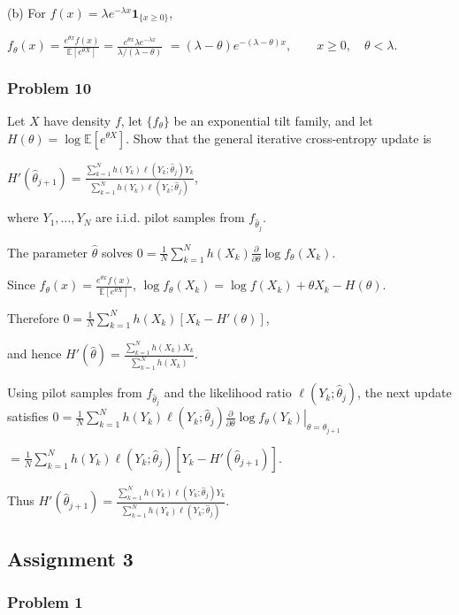 (b) For $f(x)=\lambda e^{-\lambda x}\mathbf1_{\{x\geq0\}}$,

$f_\theta(x)=\frac{e^{\theta x}f(x)}{\mathbb{E}[e^{\theta X}]}=\frac{e^{\theta x}\lambda e^{-\lambda x}}{\lambda/(\lambda-\theta)}$
$=(\lambda-\theta)e^{-(\lambda-\theta)x},\qquad x\geq0,\quad\theta<\lambda$.

\subsubsection*{Problem 10}

 Let $X$ have density $f$, let $\{f_\theta\}$ be an exponential tilt family, and let $H(\theta)=\log\mathbb{E}[e^{\theta X}]$. Show that the general iterative cross-entropy update is

$H'(\widehat\theta_{j+1})=\frac{\sum_{k=1}^Nh(Y_k)\ell(Y_k;\widehat\theta_j)Y_k}{\sum_{k=1}^Nh(Y_k)\ell(Y_k;\widehat\theta_j)}$,

where $Y_1,\ldots,Y_N$ are i.i.d. pilot samples from $f_{\widehat\theta_j}$.

 The parameter $\widehat\theta$ solves
$0=\frac1N\sum_{k=1}^Nh(X_k)\frac{\partial}{\partial\theta}\log f_\theta(X_k)$.

Since
$f_\theta(x)=\frac{e^{\theta x}f(x)}{\mathbb{E}[e^{\theta X}]}$,
$\log f_\theta(X_k)=\log f(X_k)+\theta X_k-H(\theta)$.

Therefore
$0=\frac1N\sum_{k=1}^Nh(X_k)[X_k-H'(\theta)]$,

and hence
$H'(\widehat\theta)=\frac{\sum_{k=1}^Nh(X_k)X_k}{\sum_{k=1}^Nh(X_k)}$.

Using pilot samples from $f_{\widehat\theta_j}$ and the likelihood ratio $\ell(Y_k;\widehat\theta_j)$, the next update satisfies
$0=\frac1N\sum_{k=1}^Nh(Y_k)\ell(Y_k;\widehat\theta_j)\left.\frac{\partial}{\partial\theta}\log f_\theta(Y_k)\right|_{\theta=\widehat\theta_{j+1}}$

$=\frac1N\sum_{k=1}^Nh(Y_k)\ell(Y_k;\widehat\theta_j)[Y_k-H'(\widehat\theta_{j+1})]$.

Thus
$H'(\widehat\theta_{j+1})=\frac{\sum_{k=1}^Nh(Y_k)\ell(Y_k;\widehat\theta_j)Y_k}{\sum_{k=1}^Nh(Y_k)\ell(Y_k;\widehat\theta_j)}$.

\subsection{Assignment 3}

\subsubsection*{Problem 1}

